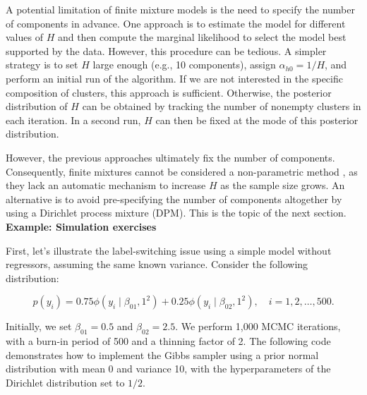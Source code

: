 A potential limitation of finite mixture models is the need to specify the number of components in advance. One approach is to estimate the model for different values of $H$ and then compute the marginal likelihood to select the model best supported by the data. However, this procedure can be tedious. A simpler strategy is to set $H$ large enough (e.g., 10 components), assign $\alpha_{h0} = 1/H$, and perform an initial run of the algorithm. If we are not interested in the specific composition of clusters, this approach is sufficient. Otherwise, the posterior distribution of $H$ can be obtained by tracking the number of nonempty clusters in each iteration. In a second run, $H$ can then be fixed at the mode of this posterior distribution. 

However, the previous approaches ultimately fix the number of components. Consequently, finite mixtures cannot be considered a non-parametric method \cite{rossi2014bayesian}, as they lack an automatic mechanism to increase \( H \) as the sample size grows. An alternative is to avoid pre-specifying the number of components altogether by using a Dirichlet process mixture (DPM). This is the topic of the next section.\\

\textbf{Example: Simulation exercises}

First, let’s illustrate the label-switching issue using a simple model without regressors, assuming the same known variance. Consider the following distribution:  

$$p(y_i) = 0.75 \phi(y_i \mid \beta_{01},1^2) + 0.25 \phi(y_i \mid \beta_{02},1^2), \quad i = 1,2,\dots,500.$$

Initially, we set $\beta_{01} = 0.5$ and $\beta_{02} = 2.5$. We perform 1,000 MCMC iterations, with a burn-in period of 500 and a thinning factor of 2. The following code demonstrates how to implement the Gibbs sampler using a prior normal distribution with mean 0 and variance 10, with the hyperparameters of the Dirichlet distribution set to $1/2$.

